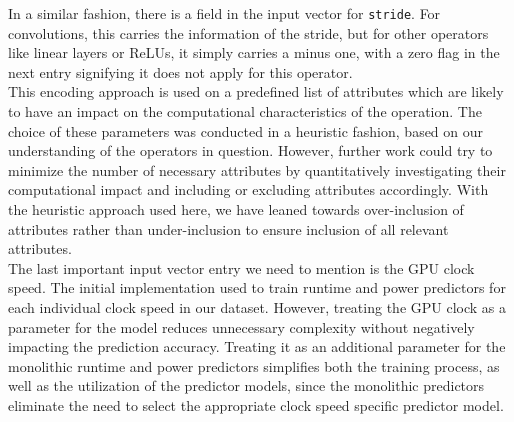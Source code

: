 In a similar fashion, there is a field in the input vector for \texttt{stride}. For convolutions, this carries the information of the stride, but for other operators like  linear layers or ReLUs, it simply carries a minus one, with a zero flag in the next entry signifying it does not apply for this operator. \\
This encoding approach is used on a predefined list of attributes which are likely to have an impact on the computational characteristics of the operation. The choice of these parameters was conducted in a heuristic fashion, based on our understanding of the operators in question. However, further work could try to minimize the number of necessary attributes by quantitatively investigating their computational impact and including or excluding attributes accordingly. With the heuristic approach used here, we have leaned towards over-inclusion of attributes rather than under-inclusion to ensure inclusion of all relevant attributes. \\
The last important input vector entry we need to mention is the GPU clock speed. The initial implementation used to train runtime and power predictors for each individual clock speed in our dataset. However, treating the GPU clock as a parameter for the model reduces unnecessary complexity without negatively impacting the prediction accuracy. Treating it as an additional parameter for the monolithic runtime and power predictors simplifies both the training process, as well as the utilization of the predictor models, since the monolithic predictors eliminate the need to select the appropriate clock speed specific predictor model.




